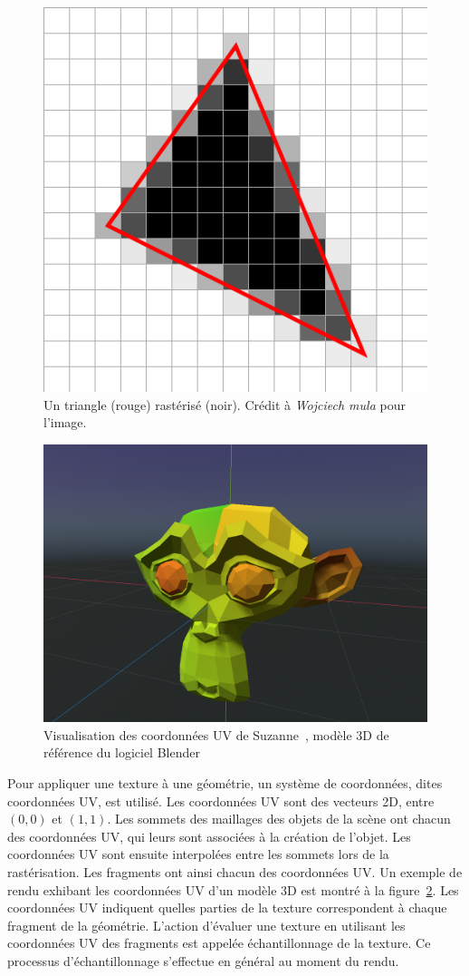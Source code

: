 \begin{figure}[h]
    \centering
    \includegraphics[width=.55\textwidth]{contenu/resources/images/rasterization}
    \caption[Rastérisation d'un triangle]{Un triangle (rouge) rastérisé (noir). Crédit à \textit{Wojciech mula} pour l'image.}
    \label{fig:rasterization}
\end{figure}

\bigskip

\begin{figure}
    \centering
    \includegraphics[width=.55\textwidth]{contenu/resources/images/uv_suzanne}
    \caption[Coordonnées UV du modèle Suzanne]{Visualisation des coordonnées UV de Suzanne~\cite{overbruggen_suzanne_2002}, modèle 3D de référence du logiciel Blender}
    \label{fig:uv-suzanne}
\end{figure}

Pour appliquer une texture à une géométrie, un système de coordonnées, dites coordonnées UV, est utilisé. Les coordonnées UV sont des vecteurs 2D, entre $(0, 0)$ et $(1, 1)$. Les sommets des maillages des objets de la scène ont chacun des coordonnées UV, qui leurs sont associées à la création de l'objet. Les coordonnées UV sont ensuite interpolées entre les sommets lors de la rastérisation. Les fragments ont ainsi chacun des coordonnées UV. Un exemple de rendu exhibant les coordonnées UV d'un modèle 3D est montré à la figure~\ref{fig:uv-suzanne}. Les coordonnées UV indiquent quelles parties de la texture correspondent à chaque fragment de la géométrie. L'action d'évaluer une texture en utilisant les coordonnées UV des fragments est appelée échantillonnage de la texture. Ce processus d'échantillonnage s'effectue en général au moment du rendu.

